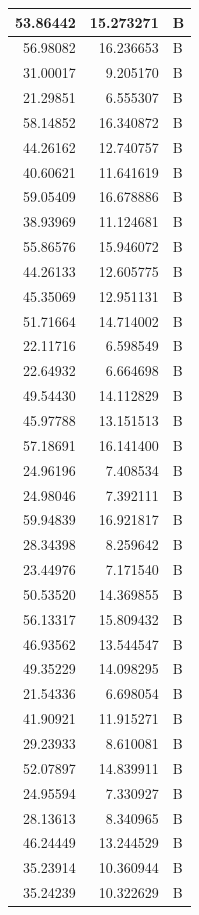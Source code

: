 \documentclass[
  letterpaper,
  DIV=11,
  numbers=noendperiod]{scrartcl}
\begin{document}
\begin{table}
\begin{tabular}[t]{r|r|l}
\hline
53.86442 & 15.273271 & B\\
\hline
56.98082 & 16.236653 & B\\
\hline
31.00017 & 9.205170 & B\\
\hline
21.29851 & 6.555307 & B\\
\hline
58.14852 & 16.340872 & B\\
\hline
44.26162 & 12.740757 & B\\
\hline
40.60621 & 11.641619 & B\\
\hline
59.05409 & 16.678886 & B\\
\hline
38.93969 & 11.124681 & B\\
\hline
55.86576 & 15.946072 & B\\
\hline
44.26133 & 12.605775 & B\\
\hline
45.35069 & 12.951131 & B\\
\hline
51.71664 & 14.714002 & B\\
\hline
22.11716 & 6.598549 & B\\
\hline
22.64932 & 6.664698 & B\\
\hline
49.54430 & 14.112829 & B\\
\hline
45.97788 & 13.151513 & B\\
\hline
57.18691 & 16.141400 & B\\
\hline
24.96196 & 7.408534 & B\\
\hline
24.98046 & 7.392111 & B\\
\hline
59.94839 & 16.921817 & B\\
\hline
28.34398 & 8.259642 & B\\
\hline
23.44976 & 7.171540 & B\\
\hline
50.53520 & 14.369855 & B\\
\hline
56.13317 & 15.809432 & B\\
\hline
46.93562 & 13.544547 & B\\
\hline
49.35229 & 14.098295 & B\\
\hline
21.54336 & 6.698054 & B\\
\hline
41.90921 & 11.915271 & B\\
\hline
29.23933 & 8.610081 & B\\
\hline
52.07897 & 14.839911 & B\\
\hline
24.95594 & 7.330927 & B\\
\hline
28.13613 & 8.340965 & B\\
\hline
46.24449 & 13.244529 & B\\
\hline
35.23914 & 10.360944 & B\\
\hline
35.24239 & 10.322629 & B\\

\end{tabular}
\end{table}
\end{document}
